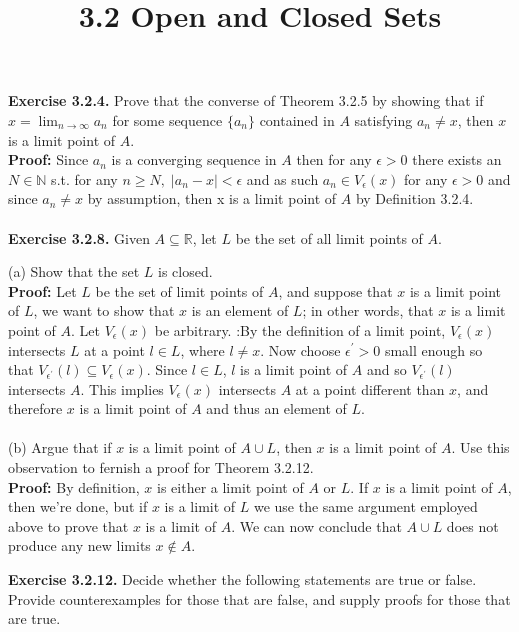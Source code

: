 \documentclass{article}
\title{\textbf{3.2 Open and Closed Sets}}
\begin{document}
\maketitle
\textbf{Exercise 3.2.4.} Prove that the converse of Theorem 3.2.5 by showing that if $x = \lim_{n \to \infty}a_n$ for some sequence $\{ a_n \}$ contained in $A$ satisfying $a_n \neq x$, then $x$ is a limit point of $A$.  \\
\textbf{Proof:} Since $a_n$ is a converging sequence in $A$ then for any $\epsilon > 0$ there exists an $N \in \mathbb{N}$ s.t. for any $n \geq N, \; |a_n - x| < \epsilon$ and as such $a_n \in V_\epsilon(x)$ for any $\epsilon > 0$ and since $a_n \neq x$ by assumption, then x is a limit point of $A$ by Definition 3.2.4. \\ \\
\textbf{Exercise 3.2.8.} Given $A \subseteq \mathbb{R}$, let $L$ be the set of all limit points of $A$.
\begin{itemize}
	(a) Show that the set $L$ is closed. \\
	\textbf{Proof:} Let $L$ be the set of limit points of $A$, and suppose that $x$ is a limit point of $L$, we want to show that $x$ is an element of $L$; in other words, that $x$ is a limit point of $A$. Let $V_\epsilon(x)$ be arbitrary. :By the definition of a limit point, $V_\epsilon(x)$ intersects $L$ at a point $l \in L$, where $l \neq x$. Now choose $\epsilon^{'} > 0$ small enough so that $V_{\epsilon^{'}}(l) \subseteq V_\epsilon(x)$. Since $l \in L$, $l$ is a limit point of $A$ and so $V_{\epsilon^{'}}(l)$ intersects $A$. This implies $V_\epsilon(x)$ intersects $A$ at a point different than $x$, and therefore $x$ is a limit point of $A$ and thus an element of $L$.\\ \\
	(b) Argue that if $x$ is a limit point of $A \cup L$, then $x$ is a limit point of $A$. Use this observation to fernish a proof for Theorem 3.2.12. \\
	\textbf{Proof:} By definition, $x$ is either a limit point of $A$ or $L$. If $x$ is a limit point of $A$, then we're done, but if $x$ is a limit of $L$ we use the same argument employed above to prove that $x$ is a limit of $A$. We can now conclude that $A \cup L$ does not produce any new limits $x \notin A$. \\
\end{itemize}
\textbf{Exercise 3.2.12.} Decide whether the following statements are true or false. \\
Provide counterexamples for those that are false, and supply proofs for those that are true. \\
\end{document}

